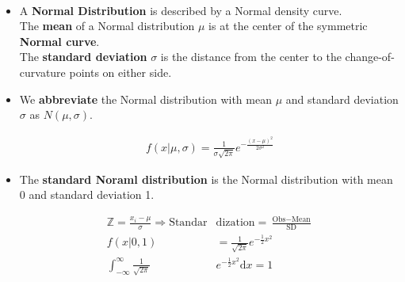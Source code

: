 \documentclass[Main.tex]{subfiles}
\begin{document}
	\begin{exercise} \hfill \\
		\begin{itemize}
			\item A \textbf{Normal Distribution} is described by a Normal density curve.\\ The \textbf{mean} of a Normal distribution $\mu$ is at the center of the symmetric \textbf{Normal curve}.\\ The \textbf{standard deviation} $\sigma$ is the distance from the center to the change-of-curvature points on either side.\\
			
			\item We \textbf{abbreviate} the Normal distribution with mean $\mu$ and standard deviation $\sigma$ as $N(\mu,\sigma)$.
			
			\begin{definition}			
				\begin{subequations}
					\begin{align}
						f(x|\mu,\sigma)=\frac{1}{\sigma\sqrt{2\pi}}e^{-\frac{(x-\mu)^{2}}{2\sigma^{2}}}
					\end{align}
				\end{subequations}	
			\end{definition}\hfill 
			
			\item The \textbf{standard Noraml distribution} is the Normal distribution with mean 0 and standard deviation 1.
			
			\begin{definition}			
				\begin{subequations}
					\begin{align}
						\mathbb{Z}=\frac{x_{i}-\mu}{\sigma}\Rightarrow\text{Standar}&\text{dization}=\frac{\text{Obs}-\text{Mean}}{\text{SD}}\\
						\mathit{f}(x|0,1)&=\frac{1}{\sqrt{2\pi}}e^{-\frac{1}{2}x^{2}} \\
						\int^{\infty}_{-\infty}\frac{1}{\sqrt{2\pi}}&e^{-\frac{1}{2}x^{2}}\mathrm{d}x=1 
					\end{align}
				\end{subequations}	
			\end{definition}\hfill								
		\end{itemize}	
	\end{exercise}
	
\end{document}

